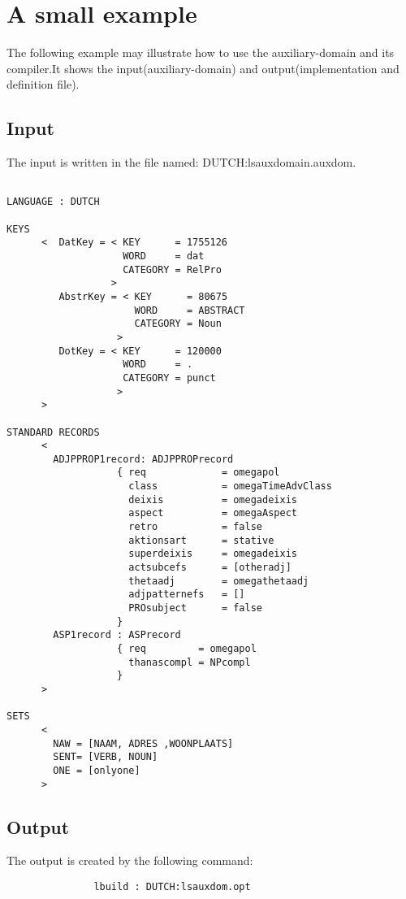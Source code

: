 \section{A small example}
The following example may illustrate how to use the auxiliary-domain and its
compiler.It shows the input(auxiliary-domain) and output(implementation and
definition file).
\subsection{Input}
The input is written in the file named: DUTCH:lsauxdomain.auxdom.
\begin{verbatim}

LANGUAGE : DUTCH

KEYS
      <  DatKey = < KEY      = 1755126
                    WORD     = dat
                    CATEGORY = RelPro
                  >
         AbstrKey = < KEY      = 80675
                      WORD     = ABSTRACT
                      CATEGORY = Noun
                   >
         DotKey = < KEY      = 120000
                    WORD     = .
                    CATEGORY = punct
                   >
      >

STANDARD RECORDS
      <
        ADJPPROP1record: ADJPPROPrecord
                   { req             = omegapol
                     class           = omegaTimeAdvClass
                     deixis          = omegadeixis
                     aspect          = omegaAspect
                     retro           = false
                     aktionsart      = stative
                     superdeixis     = omegadeixis
                     actsubcefs      = [otheradj]
                     thetaadj        = omegathetaadj
                     adjpatternefs   = []
                     PROsubject      = false
                   }
        ASP1record : ASPrecord
                   { req         = omegapol
                     thanascompl = NPcompl
                   }
      >

SETS
      <
        NAW = [NAAM, ADRES ,WOONPLAATS]
        SENT= [VERB, NOUN]
        ONE = [onlyone]
      >

\end{verbatim}
\subsection{Output}
The output is created by the following command:
\begin{verbatim}
               lbuild : DUTCH:lsauxdom.opt

\end{verbatim}
